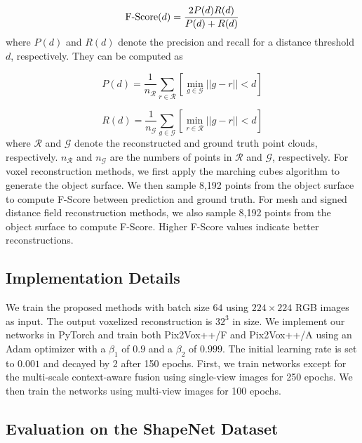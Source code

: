 \documentclass[twocolumn]{svjour3}
\begin{document}
\begin{equation}
  \textnormal{F-Score}(d) = \frac{2P(d)R(d)}{P(d) + R(d)}
\end{equation}
where $P(d)$ and $R(d)$ denote the precision and recall for a distance threshold $d$, respectively.
They can be computed as 

\begin{equation}
  P(d) = \frac{1}{n_{\mathcal{R}}} \sum_{r \in \mathcal{R}} \left[\min_{g \in \mathcal{G}} ||g - r|| < d \right]
\end{equation}

\begin{equation}
  R(d) = \frac{1}{n_{\mathcal{G}}} \sum_{g \in \mathcal{G}} \left[\min_{r \in \mathcal{R}} ||g - r|| < d \right]
\end{equation}
where $\mathcal{R}$ and $\mathcal{G}$ denote the reconstructed and ground truth point clouds, respectively.
$n_\mathcal{R}$ and $n_\mathcal{G}$ are the numbers of points in $\mathcal{R}$ and $\mathcal{G}$, respectively. 
For voxel reconstruction methods, we first apply the marching cubes algorithm \citep{DBLP:conf/siggraph/LorensenC87} to generate the object surface.
We then sample 8,192 points from the object surface to compute F-Score between prediction and ground truth.
For mesh and signed distance field reconstruction methods, we also sample 8,192 points from the object surface to compute F-Score.
Higher F-Score values indicate better reconstructions.

\subsection{Implementation Details}

We train the proposed methods with batch size $64$ using $224 \times 224$ RGB images as input.
The output voxelized reconstruction is $32^3$ in size.
We implement our networks in PyTorch \citep{DBLP:conf/nips/AdamSSGEZZALA17} and train both Pix2Vox++/F and Pix2Vox++/A using an Adam optimizer \citep{DBLP:conf/iclr/KingmaB15} with a $\beta_1$ of $0.9$ and a $\beta_2$ of $0.999$.
The initial learning rate is set to $0.001$ and decayed by 2 after 150 epochs.
First, we train networks except for the multi-scale context-aware fusion using single-view images for 250 epochs.
We then train the networks using multi-view images for 100 epochs.

\subsection{Evaluation on the ShapeNet Dataset}
\end{document}
